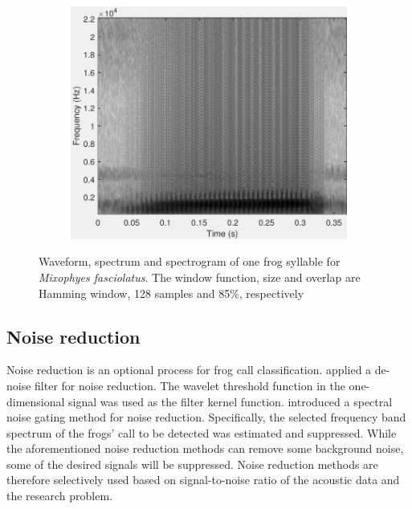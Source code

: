 \begin{figure}[htb!]
\begin{subfigure}[b]{0.32\textwidth}
           \includegraphics[width=1\textwidth,height=0.75\textwidth]{image/LR/spectrogram.pdf}
    \end{subfigure}%
\caption[Waveform, spectrum and spectrogram of one frog syllable]{Waveform, spectrum and spectrogram of one frog syllable for \textit{Mixophyes fasciolatus}. The window function, size and overlap are Hamming window, 128 samples and 85\%, respectively}
\label{fig:spectrogram}       %
\end{figure}





\subsection{Noise reduction}
Noise reduction is an optional process for frog call classification. 
\cite{Huang20141} applied a de-noise filter for noise reduction. The wavelet threshold function in the one-dimensional signal was used as the filter kernel function.
\cite{bedoya2014automatic} introduced a spectral noise gating method for noise reduction. Specifically, the selected frequency band spectrum of the frogs' call to be detected was estimated and suppressed. While the aforementioned noise reduction methods can remove some background noise, some of the desired signals will be suppressed. Noise reduction methods are therefore selectively used based on signal-to-noise ratio of the acoustic data and the research problem.




